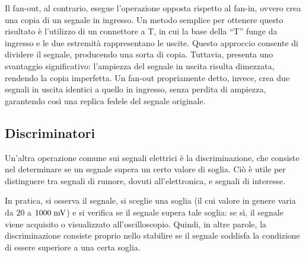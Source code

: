 
Il fan-out, al contrario, esegue l'operazione opposta rispetto al fan-in, ovvero crea una copia di un segnale in ingresso. Un metodo semplice per ottenere questo risultato è l'utilizzo di un connettore a T, in cui la base della ``T'' funge da ingresso e le due estremità rappresentano le uscite. Questo approccio consente di dividere il segnale, producendo una sorta di copia. Tuttavia, presenta uno svantaggio significativo: l'ampiezza del segnale in uscita risulta dimezzata, rendendo la copia imperfetta. Un fan-out propriamente detto, invece, crea due segnali in uscita identici a quello in ingresso, senza perdita di ampiezza, garantendo così una replica fedele del segnale originale.

\subsection{Discriminatori}
Un'altra operazione comune sui segnali elettrici è la discriminazione, che consiste nel determinare se un segnale supera un certo valore di soglia. Ciò è utile per distinguere tra segnali di rumore, dovuti all'elettronica, e segnali di interesse.

In pratica, si osserva il segnale, si sceglie una soglia (il cui valore in genere varia da $20$ a $1000 \rm \; mV$) e si verifica se il segnale supera tale soglia: se sì, il segnale viene acquisito o visualizzato all'oscilloscopio. Quindi, in altre parole, la discriminazione consiste proprio nello stabilire se il segnale soddisfa la condizione di essere superiore a una certa soglia.

